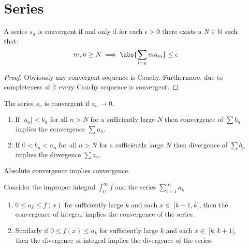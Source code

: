 \chapter{Series}
\thispagestyle{headings}
\begin{theorem}
    A series \(s_n\) is convergent if and only if for each \(\epsilon > 0\) there exists a \(N \in \mathbb{N}\) such that:
    \begin{equation*}
        m,n \geq N \implies \abs{\sum_{i = n}{m}{a_m}} \leq \epsilon
    \end{equation*}
\end{theorem}
\begin{proof}
    Obviously any convergent sequence is Cauchy. Furthermore, due to completeness of \(\mathbb{R}\) every Cauchy sequence is convergent.
\end{proof}
\begin{corollary}
    The series \(s_n\) is convergent if \(a_n \to 0\).
\end{corollary}
\begin{theorem}	\leavevmode
    \begin{enumerate}
        \item
              If \(|a_n| < b_n\) for all \(n > N\) for a sufficiently large \(N\) then convergence of \(\sum{b_n}\) implies the convergence \(\sum{a_n}\).
        \item
              If \(0 < b_n < a_n\) for all \(n > N\) for a sufficiently large \(N\) then divergence of \(\sum{b_n}\) implies the divergence \(\sum{a_n}\).
    \end{enumerate}
\end{theorem}
\begin{corollary}
    Absolute convergence implies convergence.
\end{corollary}
\begin{theorem}
    Consider the improper integral \(\int_{0}^{\infty}{f}\) and the series \(\sum_{i = 1}^{\infty}{a_k}\)
    \begin{enumerate}
        \item \(0 \leq a_k \leq f(x)\) for sufficiently large \(k\) and each \(x \in \; ]k-1, k]\), then the convergence of integral implies the convergence of the series.
        \item Similarly if \(0 \leq f(x) \leq a_k\) for sufficiently large \(k\) and each \(x \in \; [k,k+1[\), then the divergence of integral implies the divergence of the series.
    \end{enumerate}
\end{theorem}
